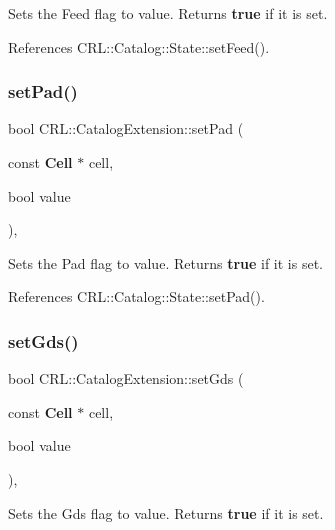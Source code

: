 Sets the Feed flag to {\ttfamily value}. Returns {\bfseries true} if it is set. 

References C\+R\+L\+::\+Catalog\+::\+State\+::set\+Feed().

\mbox{\label{classCRL_1_1CatalogExtension_afceda0d184ed2964e160b563a216bc35}} 
\subsubsection{\texorpdfstring{set\+Pad()}{setPad()}}
{\footnotesize\ttfamily bool C\+R\+L\+::\+Catalog\+Extension\+::set\+Pad (\begin{DoxyParamCaption}\item[{const \textbf{ Cell} $\ast$}]{cell,  }\item[{bool}]{value }\end{DoxyParamCaption})\hspace{0.3cm}{\ttfamily [inline]}, {\ttfamily [static]}}

Sets the Pad flag to {\ttfamily value}. Returns {\bfseries true} if it is set. 

References C\+R\+L\+::\+Catalog\+::\+State\+::set\+Pad().

\mbox{\label{classCRL_1_1CatalogExtension_a6c440bfd5ac56c9e07213c1347f0610a}} 
\subsubsection{\texorpdfstring{set\+Gds()}{setGds()}}
{\footnotesize\ttfamily bool C\+R\+L\+::\+Catalog\+Extension\+::set\+Gds (\begin{DoxyParamCaption}\item[{const \textbf{ Cell} $\ast$}]{cell,  }\item[{bool}]{value }\end{DoxyParamCaption})\hspace{0.3cm}{\ttfamily [inline]}, {\ttfamily [static]}}

Sets the Gds flag to {\ttfamily value}. Returns {\bfseries true} if it is set. 

